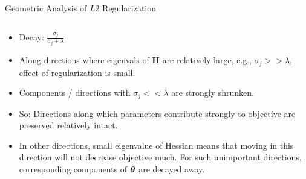 \documentclass[11pt,compress,t,notes=noshow, xcolor=table]{beamer}
\begin{document}
\begin{vbframe}{Geometric Analysis of $L2$ Regularization}
\framebreak

  
  
  
  \begin{columns}
    \begin{column}{0.5\textwidth}
      
      {\scriptsize
      \begin{itemize}\setlength{\itemsep}{1.0em}
          \item  Decay: $\frac{\sigma_j}{\sigma_j + \lambda}$ 
          \item Along directions where eigenvals of $\bm{H}$ are relatively large, e.g.,  $\sigma_j >> \lambda$, effect of regularization is small.
  \item Components / directions with $\sigma_j << \lambda$ are strongly shrunken.
  \item So: Directions along which parameters contribute strongly to objective are preserved relatively intact.
  \item In other directions, small eigenvalue of Hessian means that moving in this direction will not decrease objective much. For such unimportant directions, corresponding components of $\bm{\theta}$ are decayed away.
        \end{itemize}
      }
      \end{column}
    

\end{columns}
\end{vbframe}
\end{document}
